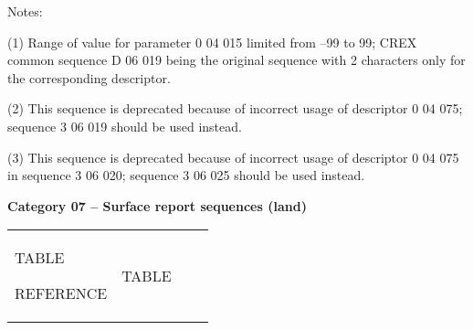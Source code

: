 Notes:

(1) Range of value for parameter 0 04 015 limited from --99 to 99; CREX common sequence D 06 019 being the original sequence with 2 characters only for the corresponding descriptor.

(2) This sequence is deprecated because of incorrect usage of descriptor 0 04 075; sequence 3 06 019 should be used instead.

(3) This sequence is deprecated because of incorrect usage of descriptor 0 04 075 in sequence 3 06 020; sequence 3 06 025 should be used instead.

\textbf{Category 07 -- Surface report sequences (land)}

\begin{longtable}[]{@{}llll@{}}
\toprule
\begin{minipage}[b]{0.22\columnwidth}\raggedright
TABLE

REFERENCE\strut
\end{minipage} & \begin{minipage}[b]{0.22\columnwidth}\raggedright
TABLE


\end{minipage}
\end{longtable}
